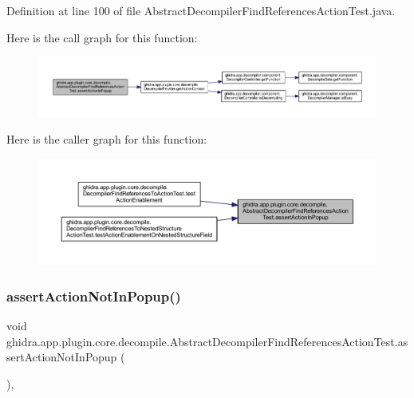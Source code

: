 Definition at line 100 of file Abstract\+Decompiler\+Find\+References\+Action\+Test.\+java.

Here is the call graph for this function\+:
\nopagebreak
\begin{figure}[H]
\begin{center}
\leavevmode
\includegraphics[width=350pt]{classghidra_1_1app_1_1plugin_1_1core_1_1decompile_1_1_abstract_decompiler_find_references_action_test_ad05621fc0e04e0d55f9aafae24f78f6f_cgraph}
\end{center}
\end{figure}
Here is the caller graph for this function\+:
\nopagebreak
\begin{figure}[H]
\begin{center}
\leavevmode
\includegraphics[width=350pt]{classghidra_1_1app_1_1plugin_1_1core_1_1decompile_1_1_abstract_decompiler_find_references_action_test_ad05621fc0e04e0d55f9aafae24f78f6f_icgraph}
\end{center}
\end{figure}
\mbox{\label{classghidra_1_1app_1_1plugin_1_1core_1_1decompile_1_1_abstract_decompiler_find_references_action_test_aa9abfadbd327de808a621ef3a7b1e896}} 
\subsubsection{\texorpdfstring{assertActionNotInPopup()}{assertActionNotInPopup()}}
{\footnotesize\ttfamily void ghidra.\+app.\+plugin.\+core.\+decompile.\+Abstract\+Decompiler\+Find\+References\+Action\+Test.\+assert\+Action\+Not\+In\+Popup (\begin{DoxyParamCaption}{ }\end{DoxyParamCaption})\hspace{0.3cm}{\ttfamily [inline]}, {\ttfamily [protected]}}



